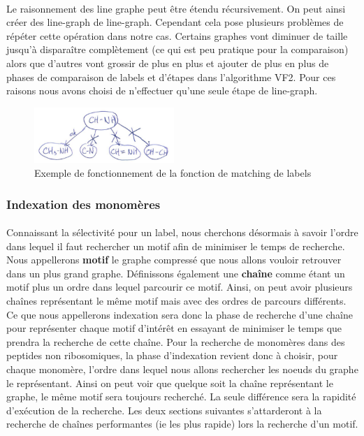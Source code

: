 \documentclass[12pt,french,twoside]{report}
\begin{document}
\paragraph{}Le raisonnement des line graphe peut être étendu récursivement. On peut ainsi créer des line-graph de line-graph.
Cependant cela pose plusieurs problèmes de répéter cette opération dans notre cas. Certains graphes vont diminuer de taille
jusqu'à disparaître complètement (ce qui est peu pratique pour la comparaison) alors que d'autres vont grossir de plus en plus
et ajouter de plus en plus de phases de comparaison de labels et d'étapes dans l'algorithme VF2. Pour ces raisons nous avons
choisi de n'effectuer qu'une seule étape de line-graph.

\begin{figure}
  \includegraphics[width=200px]{Figures/s2m/recherche/matching.pdf}
  \caption{\label{label_matching}Exemple de fonctionnement de la fonction de matching de labels}
\end{figure}

\subsubsection{Indexation des monomères}

\label{index_p}

\paragraph{}Connaissant la sélectivité pour un label, nous cherchons désormais à savoir l'ordre dans lequel il faut rechercher
un motif afin de minimiser le temps de recherche.
Nous appellerons \textbf{motif} le graphe compressé que nous allons vouloir retrouver dans un plus
grand graphe. Définissons également une \textbf{chaîne} comme étant un motif plus un ordre dans lequel parcourir ce motif. Ainsi,
on peut avoir plusieurs chaînes représentant le même motif mais avec des ordres de parcours différents. Ce que nous appellerons
indexation sera donc la phase de recherche d'une chaîne pour représenter chaque motif d'intérêt en essayant de minimiser le temps
que prendra la recherche de cette chaîne. Pour la recherche de monomères dans
des peptides non ribosomiques, la phase d'indexation revient donc à choisir, pour chaque monomère, l'ordre dans lequel nous allons
rechercher les noeuds du graphe le représentant. Ainsi on peut voir que quelque soit la chaîne représentant le graphe, le même
motif sera toujours recherché. La seule différence sera la rapidité d'exécution de la recherche. Les deux sections suivantes
s'attarderont à la recherche de chaînes performantes (ie les plus rapide) lors la recherche d'un motif.
\end{document}
